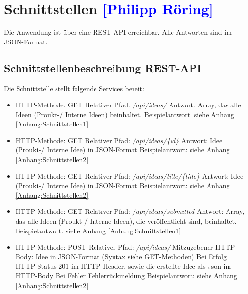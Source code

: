 

\section{Schnittstellen \textcolor{blue}{[Philipp Röring]}}

Die Anwendung ist über eine REST-API erreichbar. Alle Antworten sind im JSON-Format.

\subsection{Schnittstellenbeschreibung REST-API}
Die Schnittstelle stellt folgende Services bereit:
\begin{itemize}
    \item HTTP-Methode: GET
    \subitem Relativer Pfad: \textit{/api/ideas/}
    \subitem Antwort: Array, das alle Ideen (Proukt-/ Interne Ideen) beinhaltet.
    \subitem Beispielantwort: siehe Anhang \ref{Anhang:Schnittstellen1}
\end{itemize}

\begin{itemize}
    \item HTTP-Methode: GET
    \subitem Relativer Pfad: \textit{/api/ideas/\{id\}}
    \subitem Antwort: Idee (Proukt-/ Interne Idee) in JSON-Format
    \subitem Beispielantwort: siehe Anhang \ref{Anhang:Schnittstellen2}
\end{itemize}

\begin{itemize}
    \item HTTP-Methode: GET
    \subitem Relativer Pfad: \textit{/api/ideas/title/\{title\}}
    \subitem Antwort: Idee (Proukt-/ Interne Idee) in JSON-Format
    \subitem Beispielantwort: siehe Anhang \ref{Anhang:Schnittstellen2}
\end{itemize}

\begin{itemize}
    \item HTTP-Methode: GET
    \subitem Relativer Pfad: \textit{/api/ideas/submitted}
    \subitem Antwort: Array, das alle Ideen (Proukt-/ Interne Ideen), die veröffentlicht sind, beinhaltet.
    \subitem Beispielantwort: siehe Anhang \ref{Anhang:Schnittstellen1}
\end{itemize}

\begin{itemize}
    \item HTTP-Methode: POST
    \subitem Relativer Pfad: \textit{/api/ideas/}
    \subitem Mitzugebener HTTP-Body: Idee in JSON-Format (Syntax siehe GET-Methoden)
    \subitem Bei Erfolg
    \subsubitem HTTP-Status 201 im HTTP-Header, sowie die erstellte Idee als Json im HTTP-Body
    \subitem Bei Fehler
    \subsubitem Fehlerrückmeldung
    \subitem Beispielantwort: siehe Anhang \ref{Anhang:Schnittstellen2}
\end{itemize}

